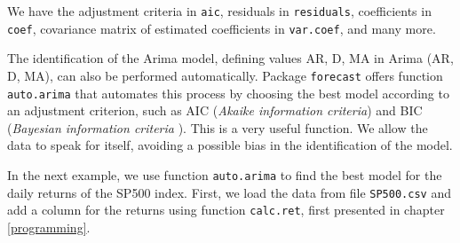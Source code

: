 \documentclass[11pt,]{book}
\newenvironment{Shaded}{\begin{snugshade}}{\end{snugshade}}
\newcommand{\KeywordTok}[1]{\textcolor[rgb]{0.27,0.27,0.27}{\textbf{#1}}}
\newcommand{\DecValTok}[1]{\textcolor[rgb]{0.06,0.06,0.06}{#1}}
\newcommand{\StringTok}[1]{\textcolor[rgb]{0.5,0.5,0.5}{#1}}
\newcommand{\CommentTok}[1]{\textcolor[rgb]{0.56,0.35,0.01}{\textit{#1}}}
\newcommand{\OtherTok}[1]{\textcolor[rgb]{0.56,0.35,0.01}{#1}}
\newcommand{\ControlFlowTok}[1]{\textcolor[rgb]{0.13,0.29,0.53}{\textbf{#1}}}
\newcommand{\OperatorTok}[1]{\textcolor[rgb]{0.81,0.36,0.00}{\textbf{#1}}}
\newcommand{\NormalTok}[1]{#1}
\begin{document}
We have the adjustment criteria in \texttt{aic}, residuals in
\texttt{residuals}, coefficients in \texttt{coef}, covariance matrix of
estimated coefficients in \texttt{var.coef}, and many more.

The identification of the Arima model, defining values AR, D, MA in
Arima (AR, D, MA), can also be performed automatically. Package
\texttt{forecast} \citep{hyndman2007automatic} offers function
\texttt{auto.arima} that automates this process by choosing the best
model according to an adjustment criterion, such as AIC (\emph{Akaike
information criteria}) and BIC (\emph{Bayesian information criteria} ).
This is a very useful function. We allow the data to speak for itself,
avoiding a possible bias in the identification of the model.

In the next example, we use function \texttt{auto.arima} to find the
best model for the daily returns of the SP500 index. First, we load the
data from file \texttt{SP500.csv} and add a column for the returns using
function \texttt{calc.ret}, first presented in chapter
\ref{programming}.

\begin{Shaded}
\end{Shaded}
\end{document}
